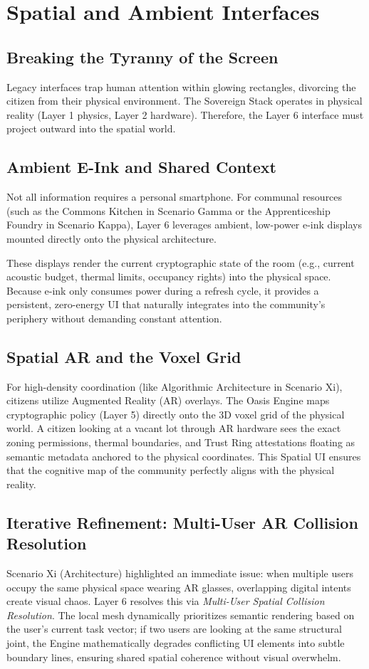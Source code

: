 \chapter{Spatial and Ambient Interfaces}

\section{Breaking the Tyranny of the Screen}
Legacy interfaces trap human attention within glowing rectangles, divorcing the citizen from their physical environment. The Sovereign Stack operates in physical reality (Layer 1 physics, Layer 2 hardware). Therefore, the Layer 6 interface must project outward into the spatial world.

\section{Ambient E-Ink and Shared Context}
Not all information requires a personal smartphone. For communal resources (such as the Commons Kitchen in Scenario Gamma or the Apprenticeship Foundry in Scenario Kappa), Layer 6 leverages ambient, low-power e-ink displays mounted directly onto the physical architecture. 

These displays render the current cryptographic state of the room (e.g., current acoustic budget, thermal limits, occupancy rights) into the physical space. Because e-ink only consumes power during a refresh cycle, it provides a persistent, zero-energy UI that naturally integrates into the community's periphery without demanding constant attention.

\section{Spatial AR and the Voxel Grid}
For high-density coordination (like Algorithmic Architecture in Scenario Xi), citizens utilize Augmented Reality (AR) overlays. The Oasis Engine maps cryptographic policy (Layer 5) directly onto the 3D voxel grid of the physical world. A citizen looking at a vacant lot through AR hardware sees the exact zoning permissions, thermal boundaries, and Trust Ring attestations floating as semantic metadata anchored to the physical coordinates. This Spatial UI ensures that the cognitive map of the community perfectly aligns with the physical reality.

\section{Iterative Refinement: Multi-User AR Collision Resolution}
Scenario Xi (Architecture) highlighted an immediate issue: when multiple users occupy the same physical space wearing AR glasses, overlapping digital intents create visual chaos. Layer 6 resolves this via \textit{Multi-User Spatial Collision Resolution}. The local mesh dynamically prioritizes semantic rendering based on the user's current task vector; if two users are looking at the same structural joint, the Engine mathematically degrades conflicting UI elements into subtle boundary lines, ensuring shared spatial coherence without visual overwhelm.

